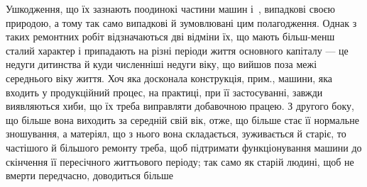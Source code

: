 Ушкодження, що їх зазнають поодинокі частини машин і~, випадкові своєю природою, а тому так
само випадкові й зумовлювані цим полагодження. Однак з таких ремонтних робіт відзначаються дві
відміни їх, що мають більш-менш сталий характер і припадають на різні періоди життя основного
капіталу — це недуги дитинства й куди численніші недуги віку, що вийшов поза межі середнього віку
життя. Хоч яка досконала конструкція, прим., машини, яка входить у продукційний процес, на практиці,
при її застосуванні, завжди виявляються хиби, що їх треба виправляти добавочною працею. З другого
боку, що більше вона виходить за середній свій вік, отже, що більше стає її нормальне зношування, а
матеріял, що з нього вона складається, зуживається й старіє, то частішого й більшого ремонту треба,
щоб підтримати функціонування машини до скінчення її пересічного життьового періоду; так само як
старій людині, щоб не вмерти передчасно, доводиться більше
\parbreak{}  %
